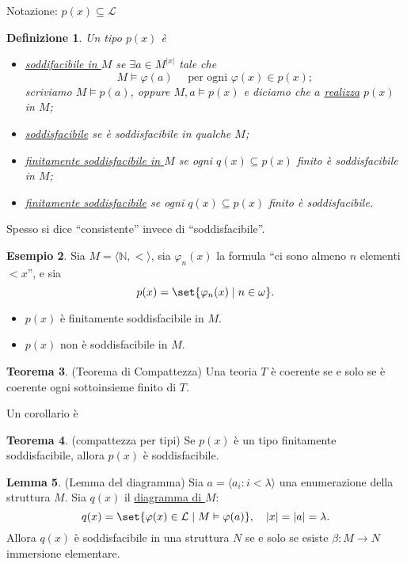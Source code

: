 \documentclass[10pt]{article}
\newcommand{\1}{\mathds{1}}
\newcommand{\N}{\mathds{N}}
\theoremstyle{definition}%
\newtheorem{thm}{Teorema}[section]
\newtheorem{lem}[thm]{Lemma}
\newtheorem{esempio}[thm]{Esempio}
\theoremstyle{plain}
\newtheorem{definizione}[thm]{Definizione}
\theoremstyle{remark}
\begin{document}
Notazione: \(p(x) \subseteq \mathcal{L}\)

\begin{definizione}
Un tipo \(p(x)\) è
\begin{itemize}
\item \uline{soddifacibile in \(M\)} se \(\exists a \in M^{|x|}\) tale che
\begin{equation*}
  M\vDash\varphi(a)\quad\text{ per ogni }\varphi(x) \in p(x);
\end{equation*}
scriviamo \(M\vDash p(a)\), oppure \(M,a\vDash p(x)\) e diciamo che \(a\) \uline{realizza} \(p(x)\) in \(M\);
\item \uline{soddisfacibile} se è soddisfacibile in qualche \(M\);
\item \uline{finitamente soddisfacibile in \(M\)} se ogni \(q(x)\subseteq p(x)\) finito è soddisfacibile in \(M\);
\item \uline{finitamente soddisfacibile} se ogni \(q(x)\subseteq p(x)\) finito è soddisfacibile.
\end{itemize}
\end{definizione}

Spesso si dice ``consistente'' invece di ``soddisfacibile''.

\begin{esempio}
Sia \(M=\langle \N, <\rangle\), sia \(\varphi_{n}(x)\) la formula ``ci sono almeno \(n\) elementi \(<x\)'', e sia
\begin{equation*}
p(x)=\set{\varphi_{n}(x)\mid n \in \omega}.
\end{equation*}
\begin{itemize}
\item \(p(x)\) è finitamente soddisfacibile in \(M\).
\item \(p(x)\) non è soddisfacibile in \(M\).
\end{itemize}
\end{esempio}

\begin{thm}
(Teorema di Compattezza)\hspace{1em} Una teoria \(T\) è coerente se e solo se è coerente ogni sottoinsieme finito di \(T\).
\end{thm}
Un corollario è
\begin{thm}
(compattezza per tipi)\hspace{1em} Se \(p(x)\) è un tipo finitamente soddisfacibile, allora \(p(x)\) è soddisfacibile.
\end{thm}

\begin{lem}
(Lemma del diagramma)\hspace{1em} Sia \(a=\langle a_{i}:i<\lambda\rangle\) una enumerazione della struttura \(M\). Sia \(q(x)\) il \uline{diagramma di \(M\)}:
\begin{equation*}
q(x)=\set{\varphi(x) \in \mathcal{L}\mid M\vDash\varphi(a)},\quad |x|=|a|=\lambda.
\end{equation*}
Allora \(q(x)\) è soddisfacibile in una struttura \(N\) se e solo se esiste \(\beta:M\to N\) immersione elementare.
\end{lem}
\end{document}
